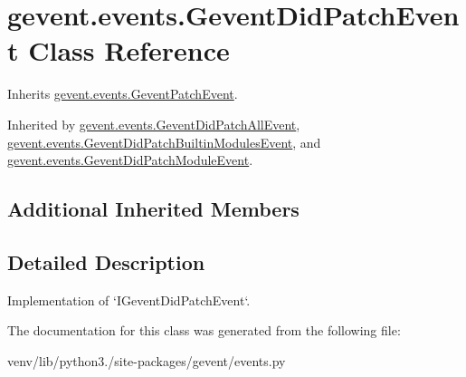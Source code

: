 \hypertarget{classgevent_1_1events_1_1_gevent_did_patch_event}{}\section{gevent.\+events.\+Gevent\+Did\+Patch\+Event Class Reference}
\label{classgevent_1_1events_1_1_gevent_did_patch_event}


Inherits \hyperlink{classgevent_1_1events_1_1_gevent_patch_event}{gevent.\+events.\+Gevent\+Patch\+Event}.



Inherited by \hyperlink{classgevent_1_1events_1_1_gevent_did_patch_all_event}{gevent.\+events.\+Gevent\+Did\+Patch\+All\+Event}, \hyperlink{classgevent_1_1events_1_1_gevent_did_patch_builtin_modules_event}{gevent.\+events.\+Gevent\+Did\+Patch\+Builtin\+Modules\+Event}, and \hyperlink{classgevent_1_1events_1_1_gevent_did_patch_module_event}{gevent.\+events.\+Gevent\+Did\+Patch\+Module\+Event}.

\subsection*{Additional Inherited Members}


\subsection{Detailed Description}
\begin{DoxyVerb}Implementation of `IGeventDidPatchEvent`.
\end{DoxyVerb}
 

The documentation for this class was generated from the following file\+:\begin{DoxyCompactItemize}
\item 
venv/lib/python3./site-\/packages/gevent/events.\+py\end{DoxyCompactItemize}
